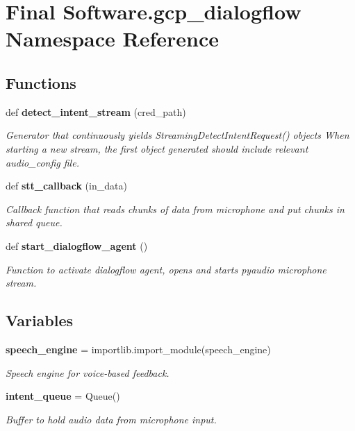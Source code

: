 \section{Final Software.\+gcp\+\_\+dialogflow Namespace Reference}
\label{namespace_final_01_software_1_1gcp__dialogflow}
\subsection*{Functions}
\begin{DoxyCompactItemize}
\item 
def \textbf{ detect\+\_\+intent\+\_\+stream} (cred\+\_\+path)
\begin{DoxyCompactList}\small\item\em Generator that continuously yields Streaming\+Detect\+Intent\+Request() objects When starting a new stream, the first object generated should include relevant audio\+\_\+config file. \end{DoxyCompactList}\item 
def \textbf{ stt\+\_\+callback} (in\+\_\+data)
\begin{DoxyCompactList}\small\item\em Callback function that reads chunks of data from microphone and put chunks in shared queue. \end{DoxyCompactList}\item 
def \textbf{ start\+\_\+dialogflow\+\_\+agent} ()
\begin{DoxyCompactList}\small\item\em Function to activate dialogflow agent, opens and starts pyaudio microphone stream. \end{DoxyCompactList}\end{DoxyCompactItemize}
\subsection*{Variables}
\begin{DoxyCompactItemize}
\item 
\textbf{ speech\+\_\+engine} = importlib.\+import\+\_\+module(\textquotesingle{}speech\+\_\+engine\textquotesingle{})
\begin{DoxyCompactList}\small\item\em Speech engine for voice-\/based feedback. \end{DoxyCompactList}\item 
\textbf{ intent\+\_\+queue} = Queue()
\begin{DoxyCompactList}\small\item\em Buffer to hold audio data from microphone input. \end{DoxyCompactList}\end{DoxyCompactItemize}


